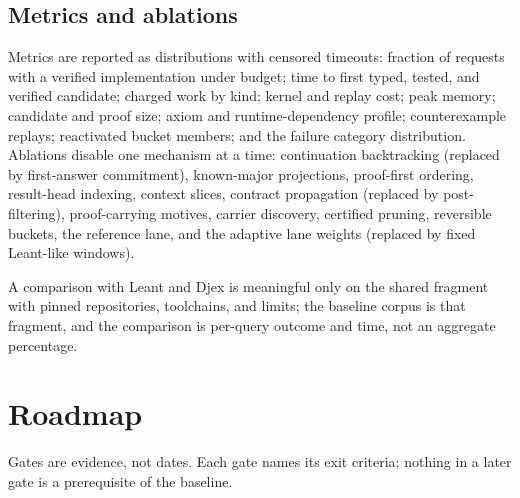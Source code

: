 \subsection{Metrics and ablations}

Metrics are reported as distributions with censored timeouts: fraction of requests with a verified implementation under budget; time to first typed, tested, and verified candidate; charged work by kind; kernel and replay cost; peak memory; candidate and proof size; axiom and runtime-dependency profile; counterexample replays; reactivated bucket members; and the failure category distribution. Ablations disable one mechanism at a time: continuation backtracking (replaced by first-answer commitment), known-major projections, proof-first ordering, result-head indexing, context slices, contract propagation (replaced by post-filtering), proof-carrying motives, carrier discovery, certified pruning, reversible buckets, the reference lane, and the adaptive lane weights (replaced by fixed Leant-like windows).

A comparison with Leant and Djex is meaningful only on the shared fragment with pinned repositories, toolchains, and limits; the baseline corpus is that fragment, and the comparison is per-query outcome and time, not an aggregate percentage.

\section{Roadmap}\label{sec:roadmap}

Gates are evidence, not dates. Each gate names its exit criteria; nothing in a later gate is a prerequisite of the baseline.

